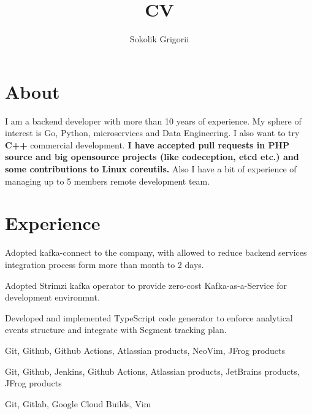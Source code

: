 \documentclass{cv}
\title {CV}
\author{Sokolik Grigorii}
\begin{document}
\maketitle

\section* {About}
I am a backend developer with more than 10 years of experience. My sphere of
interest is Go, Python, microservices and Data Engineering. I also want to try
\textbf{C++} commercial development. \textbf{I have accepted pull requests in
PHP source and big opensource projects (like codeception, etcd etc.) and some
contributions to Linux coreutils.} Also I have a bit of experience of
managing up to 5 members remote development team.


\section* {Experience}
    \begin{gaas}
      \item Adopted kafka-connect to the company, with allowed to reduce
        backend services integration process form more than month to 2 days.
      \item Adopted Strimzi kafka operator to provide zero-cost
        Kafka-as-a-Service for development environmnt.
      \item Developed and implemented TypeScript code generator to enforce
        analytical events structure and integrate with Segment tracking plan.
    \end{gaas}
    \devtools
      Git, Github, Github Actions, Atlassian products, NeoVim, JFrog products

    \devtools
      Git, Github, Jenkins, Github Actions, Atlassian products, JetBrains
      products, JFrog products

    \devtools
      Git, Gitlab, Google Cloud Builds, Vim
\end{document}
